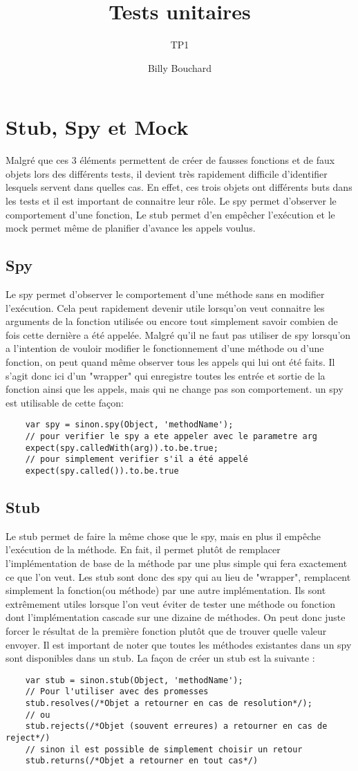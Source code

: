 \documentclass{article}
\title{Tests unitaires}
\subtitle{TP1}
\author{Billy Bouchard}{Jacob Dorais}{}
\begin{document}
\maketitle
\section*{Stub, Spy et Mock}
Malgré que ces 3 éléments permettent de créer de fausses fonctions et de faux objets lors des différents tests, il devient très rapidement difficile d'identifier lesquels servent dans quelles cas.
En effet, ces trois objets ont différents buts dans les tests et il est important de connaitre leur rôle.
Le spy permet d'observer le comportement d'une fonction,
Le stub permet d'en empêcher l'exécution et le mock permet même de planifier d'avance les appels voulus.
\subsection*{Spy}
Le spy permet d'observer le comportement d'une méthode sans en modifier l'exécution.
Cela peut rapidement devenir utile lorsqu'on veut connaitre les arguments de la fonction utilisée ou encore tout simplement savoir combien de fois cette dernière a été appelée.
Malgré qu'il ne faut pas utiliser de spy lorsqu'on a l'intention de vouloir modifier le fonctionnement d'une méthode ou d'une fonction, on peut quand même observer tous les appels qui lui ont été faits.
Il s'agit donc ici d'un "wrapper" qui enregistre toutes les entrée et sortie de la fonction ainsi que les appels, mais qui ne change pas son comportement.
un spy est utilisable de cette façon:
\begin{lstlisting}
	var spy = sinon.spy(Object, 'methodName');
	// pour verifier le spy a ete appeler avec le parametre arg
	expect(spy.calledWith(arg)).to.be.true;
	// pour simplement verifier s'il a été appelé
	expect(spy.called()).to.be.true
\end{lstlisting}
\subsection*{Stub}
Le stub permet de faire la même chose que le spy, mais en plus il empêche l'exécution de la méthode.
En fait, il permet plutôt de remplacer l'implémentation de base de la méthode par une plus simple qui fera exactement ce que l'on veut.
Les stub sont donc des spy qui au lieu de "wrapper", remplacent simplement la fonction(ou méthode) par une autre implémentation.
Ils sont extrêmement utiles lorsque l'on veut éviter de tester une  méthode ou fonction dont l'implémentation cascade sur une dizaine de méthodes.
On peut donc juste forcer le résultat de la première fonction plutôt que de trouver quelle valeur envoyer.
Il est important de noter que toutes les méthodes existantes dans un spy sont disponibles dans un stub.
La façon de créer un stub est la suivante :
\begin{lstlisting}
	var stub = sinon.stub(Object, 'methodName');
	// Pour l'utiliser avec des promesses
	stub.resolves(/*Objet a retourner en cas de resolution*/);
	// ou
	stub.rejects(/*Objet (souvent erreures) a retourner en cas de reject*/)
	// sinon il est possible de simplement choisir un retour
	stub.returns(/*Objet a retourner en tout cas*/)
\end{lstlisting}
\end{document}
